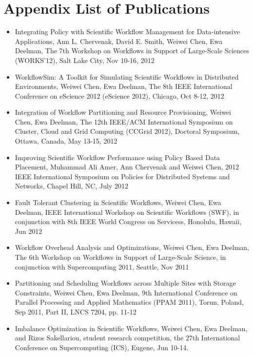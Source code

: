 \chapter*{Appendix\vskip 20pt List of Publications}
\label{ch:listofpublications}


\begin{itemize}
	\item Integrating Policy with Scientific Workflow Management for Data-intensive Applications, Ann L. Chervenak, David E. Smith, Weiwei Chen, Ewa Deelman, The 7th Workshop on Workflows in Support of Large-Scale Sciences (WORKS'12), Salt Lake City, Nov 10-16, 2012
	\item WorkflowSim: A Toolkit for Simulating Scientific Workflows in Distributed Environments, Weiwei Chen, Ewa Deelman, The 8th IEEE International Conference on eScience 2012 (eScience 2012), Chicago, Oct 8-12, 2012
	\item Integration of Workflow Partitioning and Resource Provisioning, Weiwei Chen, Ewa Deelman, The 12th IEEE/ACM International Symposium on Cluster, Cloud and Grid Computing (CCGrid 2012), Doctoral Symposium, Ottawa, Canada, May 13-15, 2012
	\item Improving Scientific Workflow Performance using Policy Based Data Placement, Muhammad Ali Amer, Ann Chervenak and Weiwei Chen, 2012 IEEE International Symposium on Policies for Distributed Systems and Networks, Chapel Hill, NC, July 2012
    \item Fault Tolerant Clustering in Scientific Workflows, Weiwei Chen, Ewa Deelman, IEEE International Workshop on Scientific Workflows (SWF), in conjunction with 8th IEEE World Congress on Servicess, Honolulu, Hawaii, Jun 2012
    \item Workflow Overhead Analysis and Optimizations, Weiwei Chen, Ewa Deelman, The 6th Workshop on Workflows in Support of Large-Scale Science, in conjunction with Supercomputing 2011, Seattle, Nov 2011
    \item Partitioning and Scheduling Workflows across Multiple Sites with Storage Constraints, Weiwei Chen, Ewa Deelman, 9th International Conference on Parallel Processing and Applied Mathematics (PPAM 2011), Torun, Poland, Sep 2011, Part II, LNCS 7204, pp. 11-12
\item Imbalance Optimization in Scientific Workflows, Weiwei Chen, Ewa Deelman, and Rizos Sakellariou, student research competition, the 27th International Conference on Supercomputing (ICS), Eugene, Jun 10-14.

\end{itemize}
